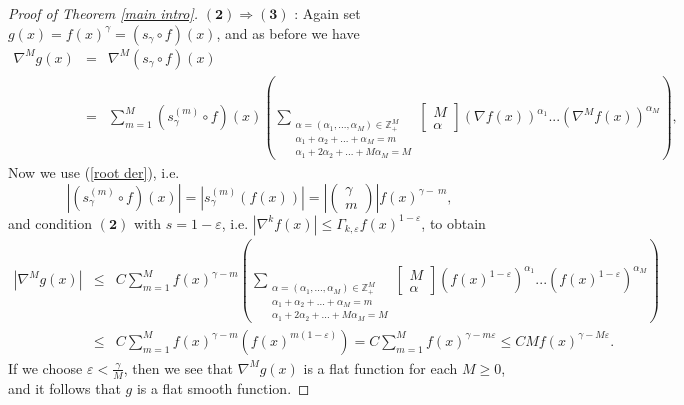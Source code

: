 \documentclass{amsart}
\theoremstyle{plain}
\numberwithin{equation}{section}
\begin{document}
\begin{proof}[Proof of Theorem \protect\ref{main intro}]
$\left( \mathbf{2}\right) \mathbf{\Longrightarrow }\left( \mathbf{3}\right) $%
: Again set $g\left( x\right) =f\left( x\right) ^{\gamma }=\left( s_{\gamma
}\circ f\right) \left( x\right) $, and as before we have 
\begin{eqnarray*}
\nabla^{M}g\left( x\right) &=&\nabla^{M}\left( s_{\gamma }\circ f\right)
\left( x\right) \\
&=&\sum_{m=1}^{M}\left( s_{\gamma }^{\left( m\right) }\circ f\right) \left(
x\right) \left( \sum_{\substack{ \alpha =\left( \alpha _{1},...,\alpha
_{M}\right) \in \mathbb{Z}_{+}^{M}  \\ \alpha _{1}+\alpha _{2}+...+\alpha
_{M}=m  \\ \alpha _{1}+2\alpha _{2}+...+M\alpha _{M}=M}}\left[ 
\begin{array}{c}
M \\ 
\alpha%
\end{array}
\right] \left( \nabla f\left( x\right) \right) ^{\alpha _{1}}...\left(
\nabla^{M}f\left( x\right) \right) ^{\alpha _{M}}\right) ,
\end{eqnarray*}%
Now we use (\ref{root der}), i.e. 
\begin{equation*}
\left\vert \left( s_{\gamma }^{\left( m\right) }\circ f\right) \left(
x\right) \right\vert =\left\vert s_{\gamma }^{\left( m\right) }\left(
f\left( x\right) \right) \right\vert =\left\vert \left( 
\begin{array}{c}
\gamma \\ 
m%
\end{array}
\right) \right\vert f\left( x\right) ^{\gamma -\ m},
\end{equation*}%
and condition $\left( \mathbf{2}\right) $ with $s=1-\varepsilon$, i.e. $%
\left\vert\nabla^{k} f\left( x\right) \right\vert \leq \Gamma
_{k,\varepsilon }f\left( x\right) ^{1-\varepsilon }$, to obtain%
\begin{eqnarray*}
\left\vert \nabla^{M}g\left( x\right) \right\vert &\leq
&C\sum_{m=1}^{M}f\left( x\right) ^{\gamma -m}\left( \sum_{\substack{ \alpha
=\left( \alpha _{1},...,\alpha _{M}\right) \in \mathbb{Z}_{+}^{M}  \\ \alpha
_{1}+\alpha _{2}+...+\alpha _{M}=m  \\ \alpha _{1}+2\alpha _{2}+...+M\alpha
_{M}=M}}\left[ 
\begin{array}{c}
M \\ 
\alpha%
\end{array}
\right] \left( f\left( x\right) ^{1-\varepsilon }\right) ^{\alpha
_{1}}...\left( f\left( x\right) ^{1-\varepsilon }\right) ^{\alpha
_{M}}\right) \\
&\leq &C\sum_{m=1}^{M}f\left( x\right) ^{\gamma -m}\left( f\left( x\right)
^{m\left( 1-\varepsilon \right) }\right) =C\sum_{m=1}^{M}f\left( x\right)
^{\gamma -m\varepsilon }\leq CMf\left( x\right) ^{\gamma -M\varepsilon }.
\end{eqnarray*}%
If we choose $\varepsilon <\frac{\gamma }{M}$, then we see that $%
\nabla^{M}g\left( x\right)$ is a flat function for each $M\geq 0$, and it
follows that $g$ is a flat smooth function.


\end{proof}
\end{document}
